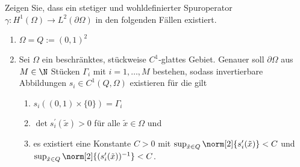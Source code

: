 
\begin{exercise}
Zeigen Sie, dass ein stetiger und wohldefinierter Spuroperator $\gamma: H^1(\Omega) \rightarrow L^2(\partial \Omega)$
in den folgenden Fällen existiert.

\begin{enumerate}[label = \textbf{\alph*)}]
  \item $\Omega = Q:=(0,1)^2$
  \item Sei $\Omega$ ein beschränktes, stückweise $C^1$-glattes Gebiet. Genauer soll
  $\partial \Omega$ aus $M \in \N$ Stücken $\Gamma_i$ mit $i = 1,\dots,M$ bestehen,
  sodass invertierbare Abbildungen $s_i \in C^1(Q,\Omega)$ existieren für die gilt
  \begin{enumerate}[label = (\alph*)]
    \item $s_i((0,1) \times \{0\}) = \Gamma_i$
    \item $\det s_i^\prime (\tilde{x}) > 0$ für alle $\tilde{x} \in \Omega$ und
    \item es existiert eine Konstante $C > 0$ mit $\sup_{\tilde{x} \in Q}\norm[2]{s_i^\prime (\tilde{x})} < C$ und
    $\sup_{\tilde{x} \in Q}\norm[2]{(s_i^\prime (\tilde{x}))^{-1}} < C$.
  \end{enumerate}
\end{enumerate}
\end{exercise}


\begin{solution}

\end{solution}

